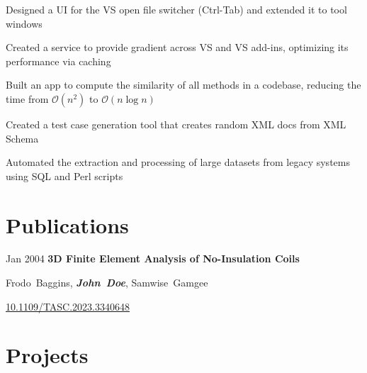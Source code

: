 	\vspace{0.10 cm}
	\begin{onecolentry}
		\begin{highlights}
			\item Designed a UI for the VS open file switcher (Ctrl-Tab) and extended it to tool windows
			\item Created a service to provide gradient across VS and VS add-ins, optimizing its performance via caching
			\item Built an app to compute the similarity of all methods in a codebase, reducing the time from $\mathcal{O}(n^2)$ to $\mathcal{O}(n \log n)$
			\item Created a test case generation tool that creates random XML docs from XML Schema
			\item Automated the extraction and processing of large datasets from legacy systems using SQL and Perl scripts
		\end{highlights}
	\end{onecolentry}
	
	
	
	
	\section{Publications}
	
	
	
	
	\begin{samepage}
		\begin{twocolentry}{
				Jan 2004
			}
			\textbf{3D Finite Element Analysis of No-Insulation Coils}
		\end{twocolentry}
		
		\vspace{0.10 cm}
		
		\begin{onecolentry}
			\mbox{Frodo Baggins}, \mbox{\textbf{\textit{John Doe}}}, \mbox{Samwise Gamgee}
			
			\vspace{0.10 cm}
			
			\href{https://doi.org/10.1109/TASC.2023.3340648}{10.1109/TASC.2023.3340648}
		\end{onecolentry}
	\end{samepage}
	
	
	
	\section{Projects}
	
